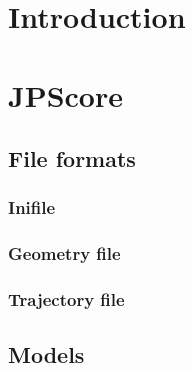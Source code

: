\documentclass[%
paper=A4,					%
twoside=true,				%
openright,					%
parskip=full,				%
chapterprefix=true,			%
11pt,						%
headings=normal,			%
bibliography=totoc,			%
listof=totoc,				%
titlepage=on,				%
captions=tableabove,		%
draft=false,				%
]{scrreprt}%
\begin{document}
\chapter{Introduction}
% 
% 


% 
% 
% 
 \chapter{JPScore}
\section{File formats}
\subsection{Inifile}

\newpage
\subsection{Geometry file}

\newpage
\subsection{Trajectory file}


\section{Models}

\newpage
\end{document}
